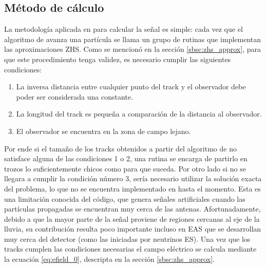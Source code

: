 		\subsection{M\'etodo de c\'alculo}
		
		La metodolog\'ia aplicada en \zhs{} para calcular la se\~nal es simple: cada vez que el algoritmo de \aires{} avanza una part\'icula se llama un grupo de rutinas que implementan las aproximaciones ZHS.
		Como se mencion\'o en la secci\'on \ref{sbsc:zhs_approx}, para que este procedimiento tenga validez, es necesario cumplir las siguientes condiciones:
		\begin{enumerate}
		\item La inversa distancia entre cualquier punto del track y el observador debe poder ser considerada una constante.
		\item La longitud del track es peque\~na a comparaci\'on de la distancia al observador.
		\item El observador se encuentra en la zona de campo lejano.
		\end{enumerate}
		Por ende si el tama\~no de los tracks obtenidos a partir del algoritmo de \aires{} no satisface alguna de las condiciones 1 o 2, una rutina se encarga de partirlo en trozos lo suficientemente chicos como para que suceda.
		Por otro lado si no se llegara a cumplir la condici\'on n\'umero 3, ser\'ia necesario utilizar la soluci\'on exacta del problema, lo que no se encuentra implementado en \zhs{} hasta el momento.
		Esta es una limitaci\'on conocida del c\'odigo, que genera se\~nales artificiales cuando las part\'iculas propagadas se encuentran muy cerca de las antenas.
		Afortunadamente, debido a que la mayor parte de la se\~nal proviene de regiones cercanas al eje de la lluvia, su contribuci\'on resulta poco importante incluso en EAS que se desarrollan muy cerca del detector (como las iniciadas por neutrinos ES).
		Una vez que los tracks cumplen las condiciones necesarias el campo el\'ectrico se calcula mediante la ecuaci\'on \ref{eq:efield_0}, descripta en la secci\'on \ref{sbsc:zhs_approx}.
		
